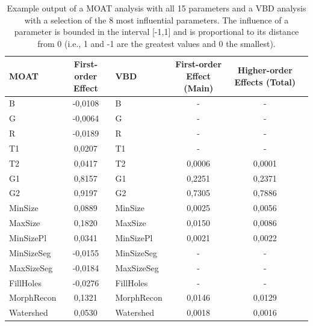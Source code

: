 \begin{table}[]
\begin{center}
\begin{scriptsize}
\begin{tabular}{lc|lccc}
\hline
MOAT       & First-order Effect & VBD        & First-order Effect (Main) & Higher-order Effects (Total) \\
\hline
B          & -0,0108            & B          & -                  & -                    \\
G          & -0,0064            & G          & -                  & -                    \\
R          & -0,0189            & R          & -                  & -                    \\
T1         & 0,0207             & T1         & -                  & -                    \\
T2         & 0,0417             & T2         & 0,0006             & 0,0001               \\
G1         & 0,8157             & G1         & 0,2251             & 0,2371               \\
G2         & 0,9197             & G2         & 0,7305             & 0,7886               \\
MinSize    & 0,0889             & MinSize    & 0,0025             & 0,0056               \\
MaxSize    & 0,1820             & MaxSize    & 0,0150             & 0,0086               \\
MinSizePl  & 0,0341             & MinSizePl  & 0,0021             & 0,0022               \\
MinSizeSeg & -0,0155            & MinSizeSeg & -                  & -                    \\
MaxSizeSeg & -0,0184            & MaxSizeSeg & -                  & -                    \\
FillHoles  & -0,0276            & FillHoles  & -                  & -                    \\
MorphRecon & 0,1321             & MorphRecon & 0,0146             & 0,0129               \\
Watershed  & 0,0530             & Watershed  & 0,0018             & 0,0016               \\
\hline
\end{tabular}
\end{scriptsize}
\caption{Example output of a MOAT analysis with all 15 parameters and a VBD analysis with a selection of the 8 most influential parameters. The influence of a parameter is bounded in the interval [-1,1] and is proportional to its distance from 0 (i.e., 1 and -1 are the greatest values and 0 the smallest).}
\label{tab:sa-out-example}
\end{center}
\end{table}

